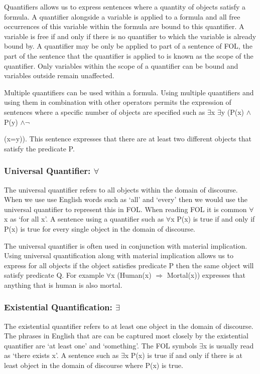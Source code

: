 Quantifiers allows us to express sentences where a quantity of objects satisfy a formula. A quantifier alongside a variable is applied to a formula and all free occurrences of this variable within the formula are bound to this quantifier. A variable is free if and only if there is no quantifier to which the variable is already bound by. A quantifier may be only be applied to part of a sentence of FOL, the part of the sentence that the quantifier is applied to is known as the scope of the quantifier. Only variables within the scope of a quantifier can be bound and variables outside remain unaffected.

Multiple quantifiers can be used within a formula. Using multiple quantifiers and using them in combination with other operators permits the expression of sentences where a specific number of objects are specified such as $\exists$x $\exists$y (P(x) $\land$ P(y) $\land \lnot$ {(x=y)). This sentence expresses that there are at least two different objects that satisfy the predicate P.


\subsubsection*{Universal Quantifier: $\forall$}

The universal quantifier refers to all objects within the domain of discourse. When we use use English words such as `all' and `every' then we would use the universal quantifier to represent this in FOL. When reading FOL it is common $\forall$x as `for all x'. A sentence using a quantifier such as $\forall$x P(x) is true if and only if P(x) is true for every single object in the domain of discourse.

The universal quantifier is often used in conjunction with material implication. Using universal quantification along with material implication allows us to express for all objects if the object satisfies predicate P then the same object will satisfy predicate Q. For example $\forall$x (Human(x) $\Rightarrow$ Mortal(x)) expresses that anything that is human is also mortal. 

\subsubsection*{Existential Quantification: $\exists$}

The existential quantifier refers to at least one object in the domain of discourse. The phrases in English that are can be captured most closely by the existential quantifier are `at least one' and `something'. The FOL symbols $\exists$x is usually read as `there exists x'. A sentence such as $\exists$x P(x) is true if and only if there is at least object in the domain of discourse where P(x) is true.

}
